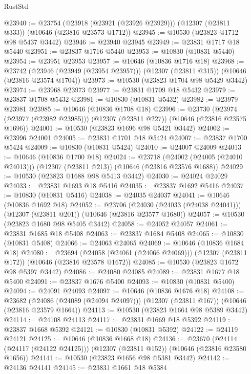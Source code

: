 \begin{lexlean}{RustStd}
\begin{coremodule}
@23940 := @23754
    (@23918 (@23921 (@23926 @23929)))
    (@12307 (@23811 @333))
    (@10646 (@23816 @23573 @1712))
@23945 := @10530 (@23823 @1712 @98 @5437 @3442)
@23946 := @23940 @23945
@23949 := @23831 @1717 @18 @5440
@23951 := @23837 @1716 @5440
@23953 := @10830 (@10831 @5440)
@23954 := @23951 @23953
@23957 := @10646 (@10836 @1716 @18)
@23968 := @23742
    (@23946 (@23949 (@23954 @23957)))
    (@12307 (@23811 @315))
    (@10646 (@23816 @23574 @1704))
@23973 := @10530 (@23823 @1704 @98 @5429 @3442)
@23974 := @23968 @23973
@23977 := @23831 @1709 @18 @5432
@23979 := @23837 @1708 @5432
@23981 := @10830 (@10831 @5432)
@23982 := @23979 @23981
@23985 := @10646 (@10836 @1708 @18)
@23996 := @23730
    (@23974 (@23977 (@23982 @23985)))
    (@12307 (@23811 @227))
    (@10646 (@23816 @23575 @1696))
@24001 := @10530 (@23823 @1696 @98 @5421 @3442)
@24002 := @23996 @24001
@24005 := @23831 @1701 @18 @5424
@24007 := @23837 @1700 @5424
@24009 := @10830 (@10831 @5424)
@24010 := @24007 @24009
@24013 := @10646 (@10836 @1700 @18)
@24024 := @23718
    (@24002 (@24005 (@24010 @24013)))
    (@12307 (@23811 @213))
    (@10646 (@23816 @23576 @1688))
@24029 := @10530 (@23823 @1688 @98 @5413 @3442)
@24030 := @24024 @24029
@24033 := @23831 @1693 @18 @5416
@24035 := @23837 @1692 @5416
@24037 := @10830 (@10831 @5416)
@24038 := @24035 @24037
@24041 := @10646 (@10836 @1692 @18)
@24052 := @23706
    (@24030 (@24033 (@24038 @24041)))
    (@12307 (@23811 @201))
    (@10646 (@23816 @23577 @1680))
@24057 := @10530 (@23823 @1680 @98 @5405 @3442)
@24058 := @24052 @24057
@24061 := @23831 @1685 @18 @5408
@24063 := @23837 @1684 @5408
@24065 := @10830 (@10831 @5408)
@24066 := @24063 @24065
@24069 := @10646 (@10836 @1684 @18)
@24080 := @23694
    (@24058 (@24061 (@24066 @24069)))
    (@12307 (@23811 @172))
    (@10646 (@23816 @23578 @1672))
@24085 := @10530 (@23823 @1672 @98 @5397 @3442)
@24086 := @24080 @24085
@24089 := @23831 @1677 @18 @5400
@24091 := @23837 @1676 @5400
@24093 := @10830 (@10831 @5400)
@24094 := @24091 @24093
@24097 := @10646 (@10836 @1676 @18)
@24108 := @23682
    (@24086 (@24089 (@24094 @24097)))
    (@12307 (@23811 @167))
    (@10646 (@23816 @23579 @1664))
@24113 := @10530 (@23823 @1664 @98 @5389 @3442)
@24114 := @24108 @24113
@24117 := @23831 @1669 @18 @5392
@24119 := @23837 @1668 @5392
@24121 := @10830 (@10831 @5392)
@24122 := @24119 @24121
@24125 := @10646 (@10836 @1668 @18)
@24136 := @23670
    (@24114 (@24117 (@24122 @24125)))
    (@12307 (@23811 @152))
    (@10646 (@23816 @23580 @1656))
@24141 := @10530 (@23823 @1656 @98 @5381 @3442)
@24142 := @24136 @24141
@24145 := @23831 @1661 @18 @5384

\end{coremodule}
\end{lexlean}
